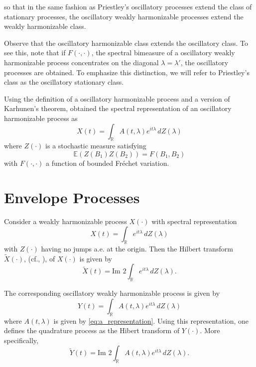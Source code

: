 \documentclass[12pt]{article}
\begin{document}
so that in the same fashion as Priestley's oscillatory processes extend the class of stationary processes, the oscillatory weakly harmonizable processes extend the weakly harmonizable class.

Observe that the oscillatory harmonizable class extends the oscillatory class. To see this, note that if $F(\cdot,\cdot)$, the spectral bimeasure of a oscillatory weakly harmonizable process concentrates on the diagonal $\lambda = \lambda'$, the oscillatory processes are obtained. To emphasize this distinction, we will refer to Priestley's class as the oscillatory stationary class.

Using the definition of a oscillatory harmonizable process and a version of Karhunen's theorem, \cite{Swift1997a} obtained the spectral representation of an oscillatory harmonizable process as
\begin{equation}
    X(t) = \int_{\mathbb{R}} A(t, \lambda) e^{it\lambda} \, dZ(\lambda)
    \label{eq:osc_harm_rep}
\end{equation}
where $Z(\cdot)$ is a stochastic measure satisfying
\begin{equation}
    \mathbb{E}(Z(B_1) Z(B_2)) = F(B_1, B_2)
    \label{eq:z_expectation}
\end{equation}
with $F(\cdot,\cdot)$ a function of bounded Fréchet variation.

\section{Envelope Processes}

Consider a weakly harmonizable process $X(\cdot)$ with spectral representation
\begin{equation}
    X(t) = \int_{\mathbb{R}} e^{it\lambda} \, dZ(\lambda)
    \label{eq:weak_harm_rep}
\end{equation}
with $Z(\cdot)$ having no jumps a.e. at the origin. Then the Hilbert transform $\tilde{X}(\cdot)$, (cf., \cite{Hasofer1979}), of $X(\cdot)$ is given by
\begin{equation}
    \tilde{X}(t) = \text{Im } 2 \int_{\mathbb{R}} e^{it\lambda} \, dZ(\lambda).
    \label{eq:hilbert_transform}
\end{equation}

The corresponding oscillatory weakly harmonizable process is given by
\begin{equation}
    Y(t) = \int_{\mathbb{R}} A(t, \lambda) e^{it\lambda} \, dZ(\lambda)
    \label{eq:y_process}
\end{equation}
where $A(t, \lambda)$ is given by \eqref{eq:a_representation}. Using this representation, one defines the quadrature process as the Hibert transform of $Y(\cdot)$. More specifically,
\begin{equation}
    \tilde{Y}(t) = \text{Im } 2 \int_{\mathbb{R}} A(t, \lambda) e^{it\lambda} \, dZ(\lambda).
    \label{eq:y_hilbert}
\end{equation}
\end{document}
